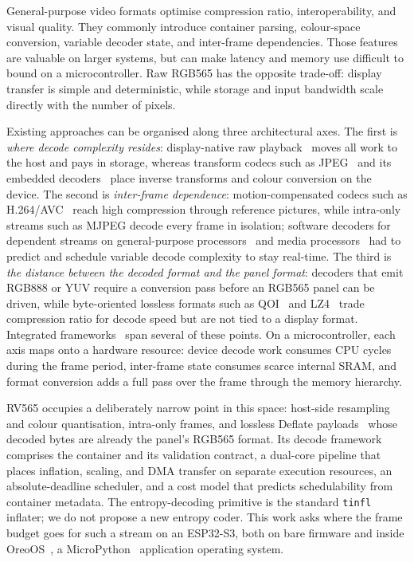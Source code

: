 \documentclass[11pt,twocolumn]{article}
\newcommand{\system}{RV565}
\begin{document}
General-purpose video formats optimise compression ratio, interoperability,
and visual quality.  They commonly introduce container parsing, colour-space
conversion, variable decoder state, and inter-frame dependencies.  Those
features are valuable on larger systems, but can make latency and memory use
difficult to bound on a microcontroller.  Raw RGB565 has the opposite
trade-off: display transfer is simple and deterministic, while storage and
input bandwidth scale directly with the number of pixels.

Existing approaches can be organised along three architectural axes.  The
first is \emph{where decode complexity resides}: display-native raw
playback~\cite{microchip2012video} moves all work to the host and pays in
storage, whereas transform codecs such as JPEG~\cite{wallace1991jpeg} and its
embedded decoders~\cite{chan2021tjpgd,espressif2026newjpeg} place inverse
transforms and colour conversion on the device.  The second is
\emph{inter-frame dependence}: motion-compensated codecs such as
H.264/AVC~\cite{wiegand2003overview} reach high compression through reference
pictures, while intra-only streams such as MJPEG decode every frame in
isolation; software decoders for dependent streams on general-purpose
processors~\cite{lee1995realtime} and media processors~\cite{mattavelli1998implementing}
had to predict and schedule variable decode complexity to stay real-time.
The third is \emph{the distance between the decoded format and the panel
format}: decoders that emit RGB888 or YUV require a conversion pass before an
RGB565 panel can be driven, while byte-oriented lossless formats such as
QOI~\cite{szablewski2022qoi} and LZ4~\cite{collet2024lz4} trade compression
ratio for decode speed but are not tied to a display format.  Integrated
frameworks~\cite{espressif2026player} span several of these points.  On a
microcontroller, each axis maps onto a hardware resource: device decode work
consumes CPU cycles during the frame period, inter-frame state consumes
scarce internal SRAM, and format conversion adds a full pass over the frame
through the memory hierarchy.

\system{} occupies a deliberately narrow point in this space: host-side
resampling and colour quantisation, intra-only frames, and lossless Deflate
payloads~\cite{deutsch1996deflate} whose decoded bytes are already the panel's
RGB565 format.  Its decode framework comprises the container and its
validation contract, a dual-core pipeline that places inflation, scaling, and
DMA transfer on separate execution resources, an absolute-deadline scheduler,
and a cost model that predicts schedulability from container metadata.  The
entropy-decoding primitive is the standard \texttt{tinfl} inflater; we do not
propose a new entropy coder.  This work asks where the frame budget goes for
such a stream on an ESP32-S3, both on bare firmware and inside
OreoOS~\cite{bhattacharya2026oreo}, a MicroPython~\cite{micropython}
application operating system.
\end{document}
